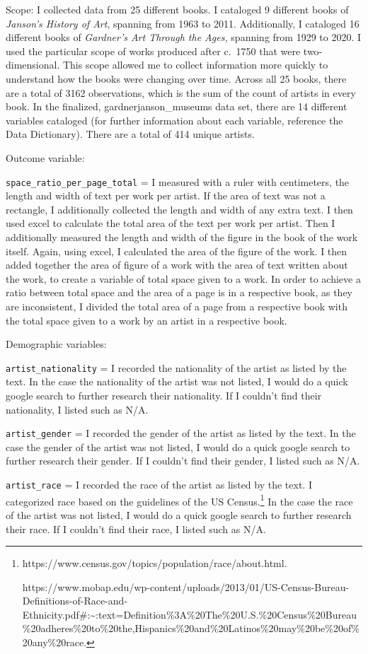 \documentclass[
  letterpaper,
  DIV=11,
  numbers=noendperiod]{scrreprt}
\begin{document}
Scope: I collected data from 25 different books. I cataloged 9 different
books of \emph{Janson's History of Art}, spanning from 1963 to 2011.
Additionally, I cataloged 16 different books of \emph{Gardner's Art
Through the Ages,} spanning from 1929 to 2020. I used the particular
scope of works produced after c.~1750 that were two-dimensional. This
scope allowed me to collect information more quickly to understand how
the books were changing over time. Across all 25 books, there are a
total of 3162 observations, which is the sum of the count of artists in
every book. In the finalized, gardnerjanson\_museums data set, there are
14 different variables cataloged (for further information about each
variable, reference the Data Dictionary). There are a total of 414
unique artists.

Outcome variable:

\texttt{space\_ratio\_per\_page\_total} = I measured with a ruler with
centimeters, the length and width of text per work per artist. If the
area of text was not a rectangle, I additionally collected the length
and width of any extra text. I then used excel to calculate the total
area of the text per work per artist. Then I additionally measured the
length and width of the figure in the book of the work itself. Again,
using excel, I calculated the area of the figure of the work. I then
added together the area of figure of a work with the area of text
written about the work, to create a variable of total space given to a
work. In order to achieve a ratio between total space and the area of a
page is in a respective book, as they are inconsistent, I divided the
total area of a page from a respective book with the total space given
to a work by an artist in a respective book.

Demographic variables:

\texttt{artist\_nationality} = I recorded the nationality of the artist
as listed by the text. In the case the nationality of the artist was not
listed, I would do a quick google search to further research their
nationality. If I couldn't find their nationality, I listed such as N/A.

\texttt{artist\_gender} = I recorded the gender of the artist as listed
by the text. In the case the gender of the artist was not listed, I
would do a quick google search to further research their gender. If I
couldn't find their gender, I listed such as N/A.

\texttt{artist\_race} = I recorded the race of the artist as listed by
the text. I categorized race based on the guidelines of the US
Census.\footnote{https://www.census.gov/topics/population/race/about.html.

  https://www.mobap.edu/wp-content/uploads/2013/01/US-Census-Bureau-Definitions-of-Race-and-Ethnicity.pdf\#:\textasciitilde:text=Definition\%3A\%20The\%20U.S.\%20Census\%20Bureau\%20adheres\%20to\%20the,Hispanics\%20and\%20Latinos\%20may\%20be\%20of\%20any\%20race.}
In the case the race of the artist was not listed, I would do a quick
google search to further research their race. If I couldn't find their
race, I listed such as N/A.
\end{document}
